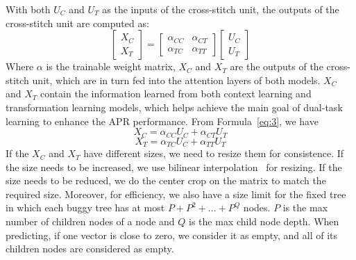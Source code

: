 With both $U_C$ and $U_T$ as the inputs of the cross-stitch unit, the
outputs of the cross-stitch unit are computed as:
\begin{equation}\label{eq:3}
	\begin{bmatrix}
		X_C\\
		X_T
	\end{bmatrix}
	=
	\begin{bmatrix}
		\alpha_{CC} &  \alpha_{CT} \\
		\alpha_{TC} &  \alpha_{TT}
	\end{bmatrix}
	\begin{bmatrix}
		U_C\\
		U_T
	\end{bmatrix}
\end{equation}
Where $\alpha$ is the trainable weight matrix, $X_C$ and $X_T$ are the
outputs of the cross-stitch unit, which are in turn fed into the
attention layers of both models. $X_C$ and $X_T$ contain the
information learned from both context learning and transformation
learning models, which helps achieve the main goal of dual-task learning
to enhance the APR performance. From Formula~\ref{eq:3}, we have
\begin{equation}\label{eq:4}
	X_C = \alpha_{CC}U_C + \alpha_{CT}U_T
\end{equation}
\begin{equation}\label{eq:5}
	X_T = \alpha_{TC}U_C + \alpha_{TT}U_T
\end{equation}
If the $X_C$ and $X_T$ have different sizes, we need to resize them
for consistence. If the size needs to be increased, we use bilinear
interpolation~\cite{bilinear-interpolation} for resizing. If the size
needs to be reduced, we do the center crop on the matrix to match the
required size. Moreover, for efficiency, we also have a size limit for
the fixed tree in which each buggy tree has at most $P+P^2+...+P^Q$
nodes.  $P$ is the max number of children nodes of a node and $Q$ is
the max child node depth. When predicting, if one vector is close
to zero, we consider it as empty, and all of its children nodes are
considered as empty.


